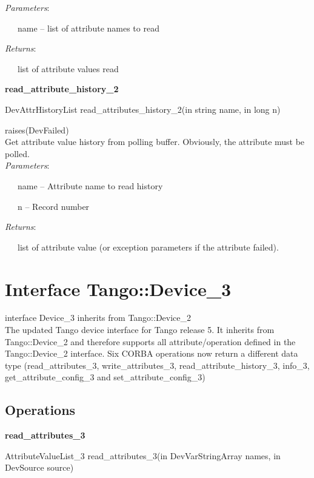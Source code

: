 \emph{Parameters}:

~~~name -- list of attribute names to read

\emph{Returns}:

~~~list of attribute values read \textbf{}\\


\begin{flushleft}
\textbf{read\_attribute\_history\_2}
\par\end{flushleft}

DevAttrHistoryList read\_attributes\_history\_2(in string name, in
long n)

raises(DevFailed)\\


Get attribute value history from polling buffer. Obviously, the attribute
must be polled.\\


\emph{Parameters}:

~~~name -- Attribute name to read history

~~~n -- Record number

\emph{Returns}:

~~~list of attribute value (or exception parameters if the attribute
failed).\\



\section{Interface Tango::Device\_3}

interface Device\_3 inherits from Tango::Device\_2\\


The updated Tango device interface for Tango release 5. It inherits
from Tango::Device\_2 and therefore supports all attribute/operation
defined in the Tango::Device\_2 interface. Six CORBA operations now
return a different data type (read\_attributes\_3, write\_attributes\_3,
read\_attribute\_history\_3, info\_3, get\_attribute\_config\_3 and
set\_attribute\_config\_3)


\subsection{Operations}

\textbf{read\_attributes\_3}

AttributeValueList\_3 read\_attributes\_3(in DevVarStringArray names,
in DevSource source)

